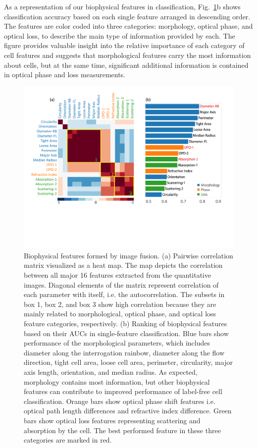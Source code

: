 \documentclass[aps,pra,reprint,superscriptaddress]{revtex4-1}
\begin{document}
As a representation of our biophysical features in classification, Fig.~\ref{fig:FeaturesCorrRank}b shows classification accuracy based on each single feature arranged in descending order. The features are color coded into three categories: morphology, optical phase, and optical loss, to describe the main type of information provided by each. The figure provides valuable insight into the relative importance of each category of cell features and suggests that morphological features carry the most information about cells, but at the same time, significant additional information is contained in optical phase and loss measurements. 

\begin{figure}
\includegraphics[scale=0.68]{FigureFeaturesCorrelationRank.pdf}
\caption{\label{fig:FeaturesCorrRank} Biophysical features formed by image fusion. (a) Pairwise correlation matrix visualized as a heat map. The map depicts the correlation between all major 16 features extracted from the quantitative images. Diagonal elements of the matrix represent correlation of each parameter with itself, i.e. the autocorrelation. The subsets in box 1, box 2, and box 3 show high correlation because they are mainly related to morphological, optical phase, and optical loss feature categories, respectively. (b) Ranking of biophysical features based on their AUCs in single-feature classification. Blue bars show performance of the morphological parameters, which includes diameter along the interrogation rainbow, diameter along the flow direction, tight cell area, loose cell area, perimeter, circularity, major axis length, orientation, and median radius. As expected, morphology contains most information, but other biophysical features can contribute to improved performance of label-free cell classification. Orange bars show optical phase shift features i.e. optical path length differences and refractive index difference. Green bars show optical loss features representing scattering and absorption by the cell. The best performed feature in these three categories are marked in red.}
\end{figure}
\end{document}
